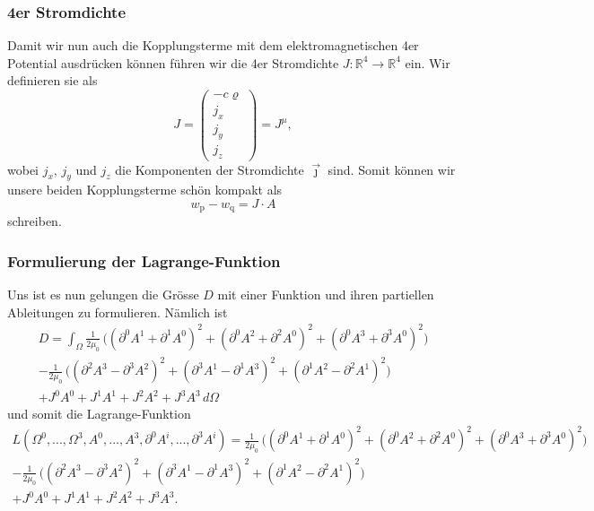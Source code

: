 \subsubsection{4er Stromdichte}
Damit wir nun auch die Kopplungsterme mit dem elektromagnetischen 4er Potential ausdrücken können führen wir die 4er Stromdichte
\(
J:\mathbb{R}^4 \rightarrow \mathbb{R}^4
\)
ein. Wir definieren sie als
\begin{equation}
J
=
\begin{pmatrix}
	-c\varrho\\
	j_x\\
	j_y\\
	j_z
\end{pmatrix}
=
J^{\mu},
\end{equation}
wobei $j_x$, $j_y$ und $j_z$ die Komponenten der Stromdichte $\vec{\jmath}$ sind.
Somit können wir unsere beiden Kopplungsterme schön kompakt  als
\begin{equation}
	w_{\text{p}} - w_{\text{q}}
	=
	J\cdot A
\end{equation}
schreiben.

\subsubsection{Formulierung der Lagrange-Funktion}
Uns ist es nun gelungen die Grösse $D$ mit einer Funktion und ihren partiellen Ableitungen zu formulieren. Nämlich ist 
\begin{align*}
D
=
\int_{\Omega}
\frac{1}{2\mu_0}\,\biggl(\left(\partial^0 A^1 + \partial^1 A^0\right)^2 + \left(\partial^0 A^2 + \partial^2 A^0\right)^2 + 
\left(\partial^0 A^3 + \partial^3 A^0\right)^2\biggr) \\
-  \frac{1}{2\mu_0}\,\biggl(\left(\partial^2 A^3 - \partial^3 A^2\right)^2 + \left(\partial^3 A^1 - \partial^1 A^3\right)^2 + 
\left(\partial^1 A^2 - \partial^2 A^1\right)^2\biggr)\\
+ J^0 A^0 + J^1 A^1 + J^2 A^2 + J^3 A^3 \,d\Omega
\end{align*}
und somit die Lagrange-Funktion
\begin{align*}
L(\Omega^0,...,\Omega^3, A^0,...,A^3, \partial^0 A^i,...,\partial^3 A^i)
=
\frac{1}{2\mu_0}\,\biggl(\left(\partial^0 A^1 + \partial^1 A^0\right)^2 + \left(\partial^0 A^2 + \partial^2 A^0\right)^2 + 
\left(\partial^0 A^3 + \partial^3 A^0\right)^2\biggr) \\
-  \frac{1}{2\mu_0}\,\biggl(\left(\partial^2 A^3 - \partial^3 A^2\right)^2 + \left(\partial^3 A^1 - \partial^1 A^3\right)^2 + 
\left(\partial^1 A^2 - \partial^2 A^1\right)^2\biggr)\\
+ J^0 A^0 + J^1 A^1 + J^2 A^2 + J^3 A^3.
\end{align*}

